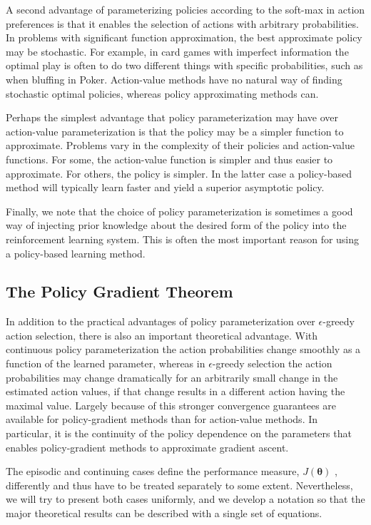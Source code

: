 \documentclass{article}
\begin{document}
A second advantage of parameterizing policies according to the soft-max in action preferences is that it enables the selection of actions with arbitrary probabilities. In problems with significant function approximation, the best approximate policy may be stochastic. 
For example, in card games with imperfect information the optimal play is often to do two different things with specific probabilities, such as when bluffing in Poker. Action-value methods have no natural way of finding stochastic optimal policies, 
whereas policy approximating methods can.

Perhaps the simplest advantage that policy parameterization may have over action-value parameterization is that the policy may be a simpler function to approximate. Problems vary in the complexity of their policies and action-value functions. 
For some, the action-value function is simpler and thus easier to approximate. For others, the policy is simpler. In the latter case a policy-based method will typically learn faster and yield a superior asymptotic policy.

Finally, we note that the choice of policy parameterization is sometimes a good way of injecting prior knowledge about the desired form of the policy into the reinforcement learning system. This is often the most important reason for using a policy-based learning method.

\subsection{The Policy Gradient Theorem}

In addition to the practical advantages of policy parameterization over $\epsilon$-greedy action selection, there is also an important theoretical advantage. With continuous policy parameterization the action probabilities change smoothly as a function of the learned parameter, 
whereas in $\epsilon$-greedy selection the action probabilities may change dramatically for an arbitrarily small change in the estimated action values, if that change results in a different action having the maximal value. Largely because of this stronger convergence guarantees are available 
for policy-gradient methods than for action-value methods. In particular, it is the continuity of the policy dependence on the parameters that enables policy-gradient methods to approximate gradient ascent.

The episodic and continuing cases define the performance measure, $J ( \pmb { \theta } )$ , differently and thus have to be treated separately to some extent. Nevertheless, we will try to present both cases uniformly, and we develop a notation so that the major theoretical results can be described with a single set of equations.
\end{document}
